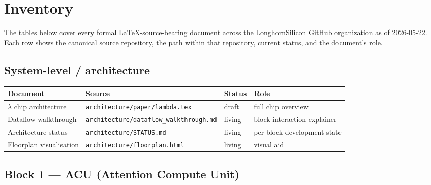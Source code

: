 \documentclass[11pt]{article}
\begin{document}
\section{Inventory}
\label{sec:inventory}

The tables below cover every formal LaTeX-source-bearing document
across the LonghornSilicon GitHub organization as of 2026-05-22. Each
row shows the canonical source repository, the path within that
repository, current status, and the document's role.

\subsection{System-level / architecture}

\begin{center}
\renewcommand{\arraystretch}{1.2}
\setlength{\tabcolsep}{4pt}
\begin{tabular}{@{}p{}p{}lp{}@{}}
\toprule
\textbf{Document} & \textbf{Source} & \textbf{Status} & \textbf{Role} \\
\midrule
$\lambda$ chip architecture & \texttt{architecture/paper/lambda.tex}
  & draft  & full chip overview \\
Dataflow walkthrough        & \texttt{architecture/dataflow\_walkthrough.md}
  & living & block interaction explainer \\
Architecture status         & \texttt{architecture/STATUS.md}
  & living & per-block development state \\
Floorplan visualisation     & \texttt{architecture/floorplan.html}
  & living & visual aid \\
\bottomrule
\end{tabular}
\end{center}

\subsection{Block 1 --- ACU (Attention Compute Unit)}
\end{document}
